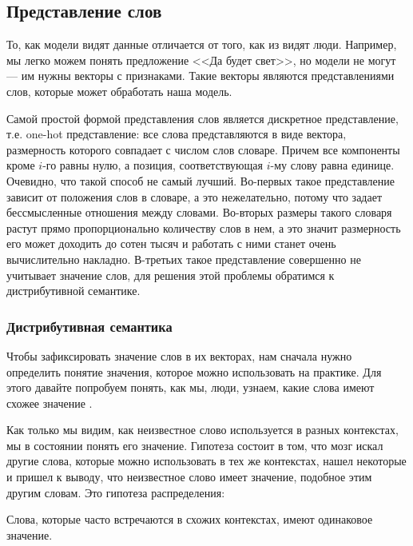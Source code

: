 \subsection{Представление слов}
\label{section:textRepsesentation}

То, как модели видят данные отличается от того, как из видят люди. Например, мы легко можем понять
предложение <<Да будет свет>>, но модели не могут --- им нужны векторы с признаками. Такие векторы являются
представлениями слов, которые может обработать наша модель.

\bigskip
Самой простой формой представления слов является дискретное представление, т.е. one-hot представление: все
слова представляются в виде вектора, размерность которого совпадает с числом слов словаре. Причем все
компоненты кроме $i$-го равны нулю, а позиция, соответствующая $i$-му слову равна единице. Очевидно, что такой
способ не самый лучший. Во-первых такое представление зависит от положения слов в словаре, а это нежелательно,
потому что задает бессмысленные отношения между словами. Во-вторых размеры такого словаря растут прямо
пропорционально количеству слов в нем, а это значит размерность его может доходить до сотен тысяч и работать с
ними станет очень вычислительно накладно. В-третьих такое представление совершенно не учитывает значение слов,
для решения этой проблемы обратимся к дистрибутивной семантике.

\subsubsection{Дистрибутивная семантика}

Чтобы зафиксировать значение слов в их векторах, нам сначала нужно определить понятие значения, которое можно использовать на практике. Для этого давайте попробуем понять, как мы, люди, узнаем, какие слова имеют схожее значение \cite{LenaVoita}.

\bigskip
Как только мы видим, как неизвестное слово используется в разных контекстах, мы в состоянии понять его значение. Гипотеза состоит в том, что мозг искал другие слова, которые можно использовать в тех же контекстах, нашел некоторые и пришел к выводу, что неизвестное слово имеет значение, подобное этим другим словам. Это гипотеза распределения:

\begin{proposition}
 Слова, которые часто встречаются в схожих контекстах, имеют одинаковое значение.
\end{proposition}

